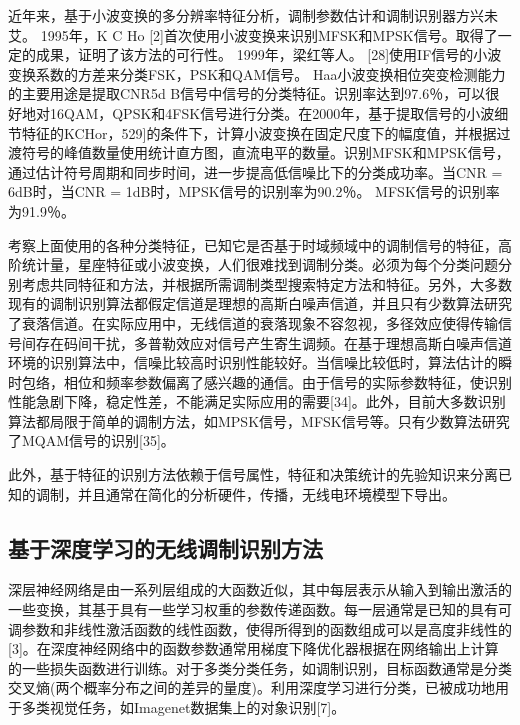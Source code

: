 近年来，基于小波变换的多分辨率特征分析，调制参数估计和调制识别器方兴未艾。 1995年，K C Ho [2]首次使用小波变换来识别MFSK和MPSK信号。取得了一定的成果，证明了该方法的可行性。 1999年，梁红等人。 [28]使用IF信号的小波变换系数的方差来分类FSK，PSK和QAM信号。 Haa小波变换相位突变检测能力的主要用途是提取CNR5d B信号中信号的分类特征。识别率达到97.6％，可以很好地对16QAM，QPSK和4FSK信号进行分类。在2000年，基于提取信号的小波细节特征的KCHor，529]的条件下，计算小波变换在固定尺度下的幅度值，并根据过渡符号的峰值数量使用统计直方图，直流电平的数量。识别MFSK和MPSK信号，通过估计符号周期和同步时间，进一步提高低信噪比下的分类成功率。当CNR = 6dB时，当CNR = 1dB时，MPSK信号的识别率为90.2％。 MFSK信号的识别率为91.9％。\par
 
考察上面使用的各种分类特征，已知它是否基于时域频域中的调制信号的特征，高阶统计量，星座特征或小波变换，人们很难找到调制分类。必须为每个分类问题分别考虑共同特征和方法，并根据所需调制类型搜索特定方法和特征。另外，大多数现有的调制识别算法都假定信道是理想的高斯白噪声信道，并且只有少数算法研究了衰落信道。在实际应用中，无线信道的衰落现象不容忽视，多径效应使得传输信号间存在码间干扰，多普勒效应对信号产生寄生调频。在基于理想高斯白噪声信道环境的识别算法中，信噪比较高时识别性能较好。当信噪比较低时，算法估计的瞬时包络，相位和频率参数偏离了感兴趣的通信。由于信号的实际参数特征，使识别性能急剧下降，稳定性差，不能满足实际应用的需要[34]。此外，目前大多数识别算法都局限于简单的调制方法，如MPSK信号，MFSK信号等。只有少数算法研究了MQAM信号的识别[35]。\par

此外，基于特征的识别方法依赖于信号属性，特征和决策统计的先验知识来分离已知的调制，并且通常在简化的分析硬件，传播，无线电环境模型下导出。\par

\subsection{基于深度学习的无线调制识别方法}
深层神经网络是由一系列层组成的大函数近似，其中每层表示从输入到输出激活的一些变换，其基于具有一些学习权重的参数传递函数。每一层通常是已知的具有可调参数和非线性激活函数的线性函数，使得所得到的函数组成可以是高度非线性的[3]。在深度神经网络中的函数参数通常用梯度下降优化器根据在网络输出上计算的一些损失函数进行训练。对于多类分类任务，如调制识别，目标函数通常是分类交叉熵(两个概率分布之间的差异的量度)。利用深度学习进行分类，已被成功地用于多类视觉任务，如Imagenet数据集上的对象识别[7]。\par

